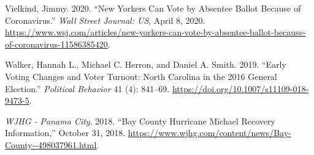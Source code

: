 \documentclass[
  12pt,
]{article}
\newlength{\cslhangindent}
\newenvironment{cslreferences}%
  {\setlength{\parindent}{0pt}%
  \everypar{\setlength{\hangindent}{\cslhangindent}}\ignorespaces}%
  {\par}
\begin{document}
\begin{cslreferences}
\leavevmode\hypertarget{ref-Vielkind2020}{}%
Vielkind, Jimmy. 2020. ``New Yorkers Can Vote by Absentee Ballot Because of Coronavirus.'' \emph{Wall Street Journal: US}, April 8, 2020. \url{https://www.wsj.com/articles/new-yorkers-can-vote-by-absentee-ballot-because-of-coronavirus-11586385420}.

\leavevmode\hypertarget{ref-Walker2019}{}%
Walker, Hannah L., Michael C. Herron, and Daniel A. Smith. 2019. ``Early Voting Changes and Voter Turnout: North Carolina in the 2016 General Election.'' \emph{Political Behavior} 41 (4): 841--69. \url{https://doi.org/10.1007/s11109-018-9473-5}.

\leavevmode\hypertarget{ref-WJHG2018}{}%
\emph{WJHG - Panama City}. 2018. ``Bay County Hurricane Michael Recovery Information,'' October 31, 2018. \url{https://www.wjhg.com/content/news/Bay-County--498037961.html}.
\end{cslreferences}
\end{document}
